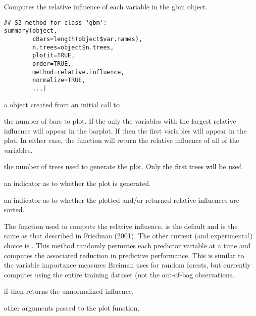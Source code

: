 \begin{Description}\relax
Computes the relative influence of each variable in the gbm object.
\end{Description}
\begin{Usage}
\begin{verbatim}
## S3 method for class 'gbm':
summary(object,
        cBars=length(object$var.names),
        n.trees=object$n.trees,
        plotit=TRUE,
        order=TRUE,
        method=relative.influence,
        normalize=TRUE,
        ...)
\end{verbatim}
\end{Usage}
\begin{Arguments}
\begin{ldescription}
\item[\code{object}] a  object created from an initial call to
.
\item[\code{cBars}] the number of bars to plot. If  the only the
variables with the  largest relative influence will appear in the
barplot. If  then the first  variables will
appear in the plot. In either case, the function will return the relative
influence of all of the variables.
\item[\code{n.trees}] the number of trees used to generate the plot. Only the first
 trees will be used.
\item[\code{plotit}] an indicator as to whether the plot is generated. 
\item[\code{order}] an indicator as to whether the plotted and/or returned relative
influences are sorted. 
\item[\code{method}] The function used to compute the relative influence.
 is the default and is the same as that
described in Friedman (2001). The other current (and experimental) choice is
. This method randomly permutes each predictor
variable at a time and computes the associated reduction in predictive
performance. This is similar to the variable importance measures Breiman uses
for random forests, but  currently computes using the entire training
dataset (not the out-of-bag observations.
\item[\code{normalize}] if  then  returns the 
unnormalized influence. 
\item[\code{...}] other arguments passed to the plot function. 
\end{ldescription}
\end{Arguments}
